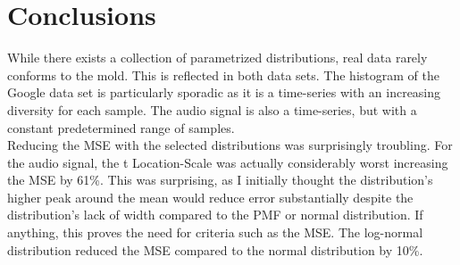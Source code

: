 \section{Conclusions} 
While there exists a collection of parametrized distributions, real data rarely conforms to the mold. This is reflected in both data sets. The histogram of the Google data set is particularly sporadic as it is a time-series with an increasing diversity for each sample. The audio signal is also a time-series, but with a constant predetermined range of samples.  \\

Reducing the MSE with the selected distributions was surprisingly troubling. For the audio signal, the t Location-Scale was actually considerably worst increasing the MSE by 61\%. This was surprising, as I initially thought the distribution's higher peak around the mean would reduce error substantially despite the distribution's lack of width compared to the PMF or normal distribution. If anything, this proves the need for criteria such as the MSE. The log-normal distribution reduced the MSE compared to the normal distribution by 10\%. 

